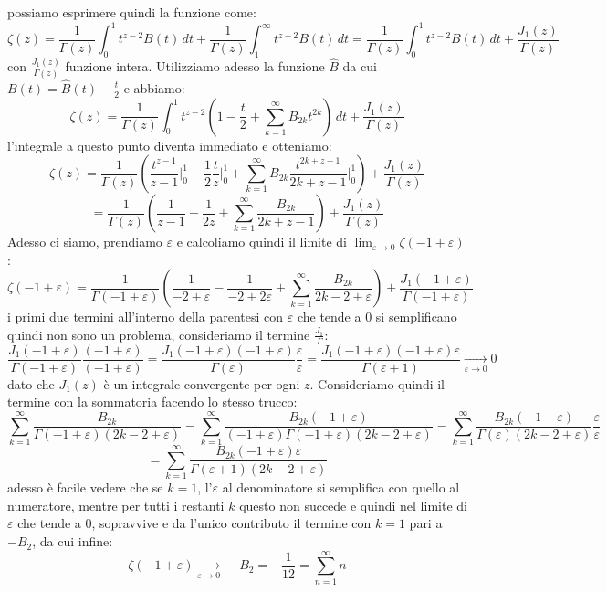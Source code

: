 possiamo esprimere quindi la funzione come:
\[\zeta(z) =  \frac{1}{\Gamma(z)}\int_0^1 t^{z-2} B(t)\,dt + \frac{1}{\Gamma(z)}\int_1^\infty t^{z-2} B(t)\,dt = \frac{1}{\Gamma(z)}\int_0^1 t^{z-2} B(t)\,dt + \frac{J_1(z)}{\Gamma(z)}\]
con $\frac{J_1(z)}{\Gamma(z)}$ funzione intera. Utilizziamo adesso la funzione $\hat{B}$ da cui $B(t) = \hat{B}(t)-\frac{t}{2}$ e abbiamo:
\[\zeta(z) =  \frac{1}{\Gamma(z)}\int_0^1 t^{z-2}( 1 -\frac{t}{2}+ \sum_{k=1}^\infty B_{2k}t^{2k} ) \,dt + \frac{J_1(z)}{\Gamma(z)}\]
l'integrale a questo punto diventa immediato e otteniamo:
\[\zeta(z)  =  \frac{1}{\Gamma(z)} \left(\frac{t^{z-1}}{z-1}\bigg|_0^1 -\frac{1}{2}\frac{t}{z}\bigg|_0^1 + \sum_{k=1}^\infty B_{2k} \frac{t^{2k+z-1}}{2k+z-1}\bigg|_0^1 \right)  + \frac{J_1(z)}{\Gamma(z)}\]
\[= \frac{1}{\Gamma(z)} \left(\frac{1}{z-1}-\frac{1}{2z} + \sum_{k=1}^\infty \frac{B_{2k}}{2k+z-1}\right)  + \frac{J_1(z)}{\Gamma(z)}\]
Adesso ci siamo, prendiamo $\varepsilon$ e calcoliamo quindi il limite di $\displaystyle\lim_{\varepsilon\to0}\zeta(-1+\varepsilon)$:
\[\zeta(-1+\varepsilon) = \frac{1}{\Gamma(-1+\varepsilon)} \left(\frac{1}{-2+\varepsilon}-\frac{1}{-2+2\varepsilon} + \sum_{k=1}^\infty \frac{B_{2k}}{2k-2+\varepsilon}\right)  + \frac{J_1(-1+\varepsilon)}{\Gamma(-1+\varepsilon)}\]
i primi due termini all'interno della parentesi con $\varepsilon$ che tende a 0 si semplificano quindi non sono un problema, consideriamo il termine $\frac{J_1}{\Gamma}$:
\[\frac{J_1(-1+\varepsilon)}{\Gamma(-1+\varepsilon)}\frac{(-1+\varepsilon)}{(-1+\varepsilon)} =\frac{J_1(-1+\varepsilon)(-1+\varepsilon)}{\Gamma(\varepsilon)}\frac{\varepsilon}{\varepsilon} = \frac{J_1(-1+\varepsilon)(-1+\varepsilon)\varepsilon}{\Gamma(\varepsilon +1)} \xrightarrow[\varepsilon\to 0]{} 0\]
dato che $J_1(z)$ è un integrale convergente per ogni $z.$ Consideriamo quindi il termine con la sommatoria facendo lo stesso trucco:
\[\sum_{k=1}^\infty \frac{B_{2k}}{\Gamma(-1+\varepsilon)(2k-2+\varepsilon)} = \sum_{k=1}^\infty \frac{B_{2k}(-1+\varepsilon)}{(-1+\varepsilon)\Gamma(-1+\varepsilon)(2k-2+\varepsilon)} =  \sum_{k=1}^\infty \frac{B_{2k}(-1+\varepsilon)}{\Gamma(\varepsilon)(2k-2+\varepsilon)}\frac{\varepsilon}{\varepsilon}\]\[ = \sum_{k=1}^\infty \frac{B_{2k}(-1+\varepsilon)\varepsilon}{\Gamma(\varepsilon+1)(2k-2+\varepsilon)}\]
adesso è facile vedere che se $k=1$, l'$\varepsilon$ al denominatore si semplifica con quello al numeratore, mentre per tutti i restanti $k$ questo non succede e quindi nel limite di $\varepsilon$ che tende a 0, sopravvive e da l'unico contributo il termine con $k=1$ pari a $-B_2$, da cui infine:
\[\zeta(-1+\varepsilon)\xrightarrow[\varepsilon\to 0]{} -B_2 = -\frac{1}{12} = \sum_{n=1}^\infty n\]
